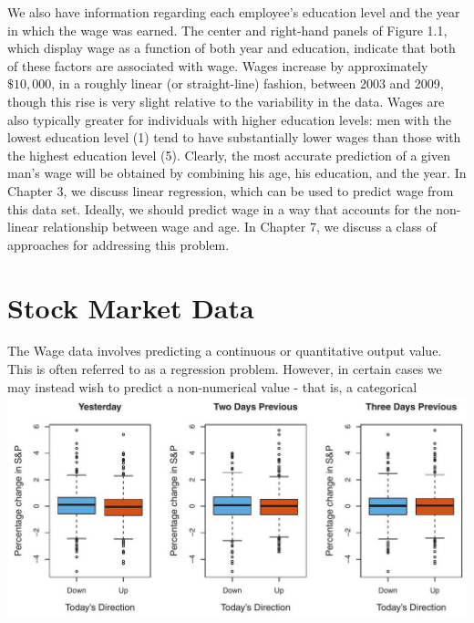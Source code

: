 \documentclass[10pt]{article}
\begin{document}
We also have information regarding each employee's education level and the year in which the wage was earned. The center and right-hand panels of Figure 1.1, which display wage as a function of both year and education, indicate that both of these factors are associated with wage. Wages increase by approximately $\$ 10,000$, in a roughly linear (or straight-line) fashion, between 2003 and 2009, though this rise is very slight relative to the variability in the data. Wages are also typically greater for individuals with higher education levels: men with the lowest education level (1) tend to have substantially lower wages than those with the highest education level (5). Clearly, the most accurate prediction of a given man's wage will be obtained by combining his age, his education, and the year. In Chapter 3, we discuss linear regression, which can be used to predict wage from this data set. Ideally, we should predict wage in a way that accounts for the non-linear relationship between wage and age. In Chapter 7, we discuss a class of approaches for addressing this problem.

\section*{Stock Market Data}
The Wage data involves predicting a continuous or quantitative output value. This is often referred to as a regression problem. However, in certain cases we may instead wish to predict a non-numerical value - that is, a categorical\\
\includegraphics[max width=\textwidth, center]{2025_05_05_efe77898333945044de4g-018}
\end{document}
